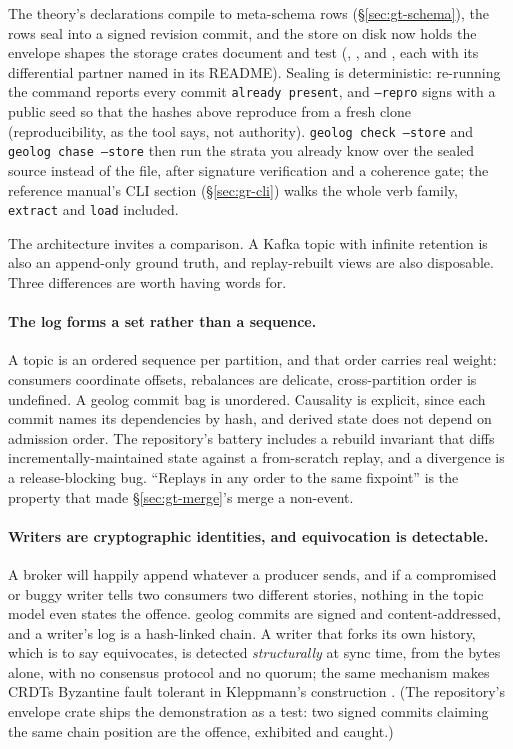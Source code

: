 \noindent The theory's declarations compile to meta-schema rows
(\S\ref{sec:gt-schema}), the rows seal into a signed revision commit,
and the store on disk now holds the envelope shapes the storage
crates document and test (, ,
and , each with its differential partner named in
its README). Sealing is deterministic: re-running the command reports
every commit \texttt{already present}, and \texttt{--repro} signs
with a public seed so that the hashes above reproduce from a fresh
clone (reproducibility, as the tool says, not authority).
\texttt{geolog check --store} and \texttt{geolog chase --store} then
run the strata you already know over the sealed source instead of the
file, after signature verification and a coherence gate; the
reference manual's CLI section (\S\ref{sec:gr-cli}) walks the whole
verb family, \texttt{extract} and \texttt{load} included.

The architecture invites a comparison. A Kafka topic with infinite
retention is also an append-only ground truth, and replay-rebuilt
views are also disposable. Three differences are worth having words
for.

\paragraph{The log forms a set rather than a sequence.} A topic is an
ordered sequence per partition, and that order carries real weight:
consumers coordinate offsets, rebalances are delicate, cross-partition
order is undefined. A geolog commit bag is unordered. Causality is
explicit, since each commit names its dependencies by hash, and
derived state does not depend on admission order. The repository's
battery includes a rebuild invariant that diffs
incrementally-maintained state against a from-scratch replay, and a
divergence is a release-blocking bug. ``Replays in any order to the
same fixpoint'' is the property that made \S\ref{sec:gt-merge}'s merge
a non-event.

\paragraph{Writers are cryptographic identities, and equivocation is
detectable.} A broker will happily append whatever a producer sends,
and if a compromised or buggy writer tells two consumers two different
stories, nothing in the topic model even states the offence. geolog
commits are signed and content-addressed, and a writer's log is a
hash-linked chain. A writer that forks its own history, which is to
say equivocates, is detected \emph{structurally} at sync time, from
the bytes alone, with no consensus protocol and no quorum; the same
mechanism makes CRDTs Byzantine fault tolerant in Kleppmann's
construction \cite{kleppmann22}. (The repository's envelope crate
ships the demonstration as a test: two signed commits claiming the
same chain position are the offence, exhibited and caught.)

